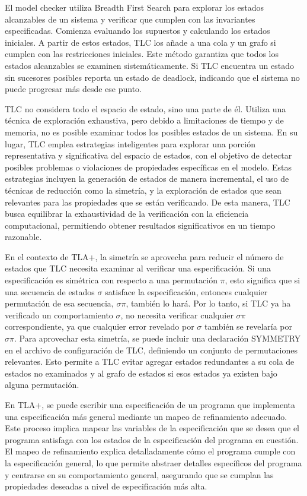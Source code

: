 \documentclass[runningheads]{llncs}
\begin{document}
El model checker utiliza Breadth First Search para explorar los estados alcanzables de un sistema y verificar que cumplen con las invariantes especificadas. Comienza evaluando los supuestos y calculando los estados iniciales. A partir de estos estados, TLC los añade a una cola y un grafo si cumplen con las restricciones iniciales. Este método garantiza que todos los estados alcanzables se examinen sistemáticamente. Si TLC encuentra un estado sin sucesores posibles reporta un estado de deadlock, indicando que el sistema no puede progresar más desde ese punto.

TLC no considera todo el espacio de estado, sino una parte de él. Utiliza una técnica de exploración exhaustiva, pero debido a limitaciones de tiempo y de memoria, no es posible examinar todos los posibles estados de un sistema. En su lugar, TLC emplea estrategias inteligentes para explorar una porción representativa y significativa del espacio de estados, con el objetivo de detectar posibles problemas o violaciones de propiedades específicas en el modelo. Estas estrategias incluyen la generación de estados de manera incremental, el uso de técnicas de reducción como la simetría, y la exploración de estados que sean relevantes para las propiedades que se están verificando. De esta manera, TLC busca equilibrar la exhaustividad de la verificación con la eficiencia computacional, permitiendo obtener resultados significativos en un tiempo razonable.

En el contexto de TLA+, la simetría se aprovecha para reducir el número de estados que TLC necesita examinar al verificar una especificación. Si una especificación es simétrica con respecto a una permutación $\pi$, esto significa que si una secuencia de estados $\sigma$ satisface la especificación, entonces cualquier permutación de esa secuencia, $\sigma\pi$, también lo hará. Por lo tanto, si TLC ya ha verificado un comportamiento $\sigma$, no necesita verificar cualquier $\sigma\pi$ correspondiente, ya que cualquier error revelado por $\sigma$ también se revelaría por $\sigma\pi$.
Para aprovechar esta simetría, se puede incluir una declaración SYMMETRY en el archivo de configuración de TLC, definiendo un conjunto de permutaciones relevantes. Esto permite a TLC evitar agregar estados redundantes a su cola de estados no examinados y al grafo de estados si esos estados ya existen bajo alguna permutación.

En TLA+, se puede escribir una especificación de un programa que implementa una especificación más general mediante un mapeo de refinamiento adecuado. Este proceso implica mapear las variables de la especificación que se desea que el programa satisfaga con los estados de la especificación del programa en cuestión. El mapeo de refinamiento explica detalladamente cómo el programa cumple con la especificación general, lo que permite abstraer detalles específicos del programa y centrarse en su comportamiento general, asegurando que se cumplan las propiedades deseadas a nivel de especificación más alta.
\end{document}
